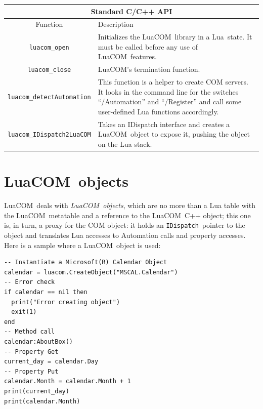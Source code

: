 \documentclass[11pt,a4paper,english]{report}
\newcommand{\ttext}[1]{#1}
\newcommand{\ttitle}[1]{#1}
\newcommand{\tlinetitB}[2]{#1 & #2 \\ \hline \hline}
\newcommand{\ttext}[1]{{\raggedright #1 \\}}
\newcommand{\ttitle}[1]{\begin{minipage}{\colA cm} \centering \bf #1 \end{minipage}}
\newcommand{\tlinetitB}[2]{\ttitle{#1} & \ttitle{#2} \\ \hline \hline}
\newcommand{\ident}[1]{\mbox{\texttt{#1}}}
\newcommand{\techname}[1]{\mbox{#1}}
\newcommand{\lua}{\techname{Lua}}
\newcommand{\luacom}{\techname{LuaCOM}}
\newcommand{\idispatch}{\ident{IDispatch}}
\begin{document}
  \begin{center}
  \begin{tabular}{|c|p{6cm}|}

  \multicolumn{2}{c}{\large Standard C/C++ API} \\
  \hline

  \tlinetitB{Function}{Description}

  \verb+luacom_open+ & \ttext{Initializes the \luacom\ library in a
    \lua\ state. It must be called before any use of \luacom\
    features.} \\ \hline

  \verb+luacom_close+
    & \ttext{\luacom's termination function.} \\ \hline

  \verb+luacom_detectAutomation+
    & \ttext{This function is a helper to create COM servers. It looks
    in the command line for the switches ``/Automation'' and
    ``/Register'' and call some user-defined Lua functions accordingly.} \\ \hline


  \verb+luacom_IDispatch2LuaCOM+
    & \ttext{Takes an IDispatch interface and creates a \luacom\
    object to expose it, pushing the object on the Lua stack.} \\ \hline

  \end{tabular}
  \end{center}



\section{\luacom\ objects}
  \luacom\ deals with \emph{\luacom\ objects}, which are no more than
  a Lua table with the \luacom\ metatable and a reference to the
  \luacom\ C++ object; this one is, in turn, a proxy for the COM
  object: it holds an \idispatch\ pointer to the object and translates
  Lua accesses to Automation calls and property accesses. Here is a
  sample where a \luacom\ object is used:

\begin{verbatim}
-- Instantiate a Microsoft(R) Calendar Object
calendar = luacom.CreateObject("MSCAL.Calendar")
-- Error check
if calendar == nil then
  print("Error creating object")
  exit(1)
end
-- Method call
calendar:AboutBox()
-- Property Get
current_day = calendar.Day
-- Property Put
calendar.Month = calendar.Month + 1
print(current_day)
print(calendar.Month)
\end{verbatim}
\end{document}
